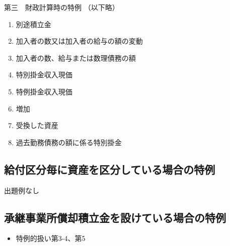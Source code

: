 \begin{fillblank}[数理人試験 2021 問題1 設問1 改題]
\begin{lawstructure}
\begin{lawarticle}{第三　財政計算時の特例}{}
      （以下略）
    \end{lawarticle}
  \end{lawstructure}
\end{fillblank}

\begin{answerbox}
  \begin{enumerate}[A: ]
    \item 別途積立金
    \item 加入者の数又は加入者の給与の額の変動
    \item 加入者の数、給与または数理債務の額
    \item 特別掛金収入現価
    \item 特例掛金収入現価
    \item 増加
    \item 受換した資産
    \item 過去勤務債務の額に係る特別掛金
  \end{enumerate}
\end{answerbox}

\newpage

\subsection{給付区分毎に資産を区分している場合の特例}

出題例なし

\newpage

\subsection{承継事業所償却積立金を設けている場合の特例}



\begin{InyouJobunbox}
  \begin{itemize}
    \item 特例的扱い第3-4、第5
  \end{itemize}
\end{InyouJobunbox}

